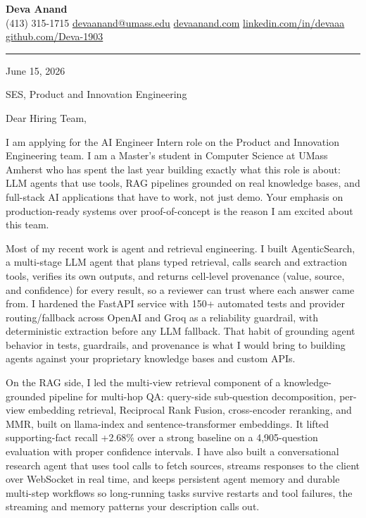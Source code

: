 \documentclass[letterpaper,11pt]{article}
\begin{document}
\begin{center}
    {\LARGE \bfseries \textcolor{ResumeNavy}{Deva Anand}} \\ \vspace{3pt}
    \small
    (413) 315-1715 \enspace\textbar\enspace
    \href{mailto:devaanand@umass.edu}{devaanand@umass.edu} \enspace\textbar\enspace
    \href{https://devaanand.com}{devaanand.com} \enspace\textbar\enspace
    \href{https://linkedin.com/in/devaaa/}{linkedin.com/in/devaaa} \enspace\textbar\enspace
    \href{https://github.com/Deva-1903}{github.com/Deva-1903}
\end{center}
\vspace{2pt}
\hrule
\vspace{10pt}

\noindent June 15, 2026

\noindent SES, Product and Innovation Engineering

\vspace{4pt}
\noindent Dear Hiring Team,

I am applying for the AI Engineer Intern role on the Product and Innovation Engineering team. I am a Master's student in Computer Science at UMass Amherst who has spent the last year building exactly what this role is about: LLM agents that use tools, RAG pipelines grounded on real knowledge bases, and full-stack AI applications that have to work, not just demo. Your emphasis on production-ready systems over proof-of-concept is the reason I am excited about this team.

Most of my recent work is agent and retrieval engineering. I built AgenticSearch, a multi-stage LLM agent that plans typed retrieval, calls search and extraction tools, verifies its own outputs, and returns cell-level provenance (value, source, and confidence) for every result, so a reviewer can trust where each answer came from. I hardened the FastAPI service with 150+ automated tests and provider routing/fallback across OpenAI and Groq as a reliability guardrail, with deterministic extraction before any LLM fallback. That habit of grounding agent behavior in tests, guardrails, and provenance is what I would bring to building agents against your proprietary knowledge bases and custom APIs.

On the RAG side, I led the multi-view retrieval component of a knowledge-grounded pipeline for multi-hop QA: query-side sub-question decomposition, per-view embedding retrieval, Reciprocal Rank Fusion, cross-encoder reranking, and MMR, built on llama-index and sentence-transformer embeddings. It lifted supporting-fact recall +2.68\% over a strong baseline on a 4,905-question evaluation with proper confidence intervals. I have also built a conversational research agent that uses tool calls to fetch sources, streams responses to the client over WebSocket in real time, and keeps persistent agent memory and durable multi-step workflows so long-running tasks survive restarts and tool failures, the streaming and memory patterns your description calls out.
\end{document}
